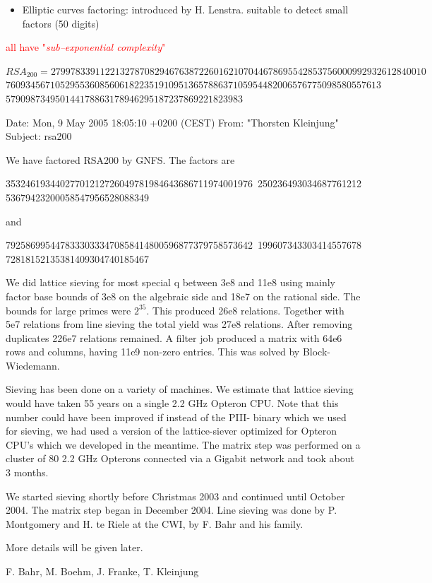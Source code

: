 \documentclass[landscape,handout]{powersem} %
\newcommand{\heading}[1]{%
 \begin{center}
  \large\bf
  \shadowbox{{\textcolor{conceptcolor}{#1}}}%
 \end{center}
 \vspace{1ex minus 1ex}}
\begin{document}
\begin{slide}
\begin{itemize}
\item[\textcolor{blue}{\ding{185}}]
  Elliptic curves factoring: introduced by  H. Lenstra.
  suitable to detect small factors (50 digits)\pause

\end{itemize}

\centerline{\textcolor{red}{all have "\emph{sub--exponential complexity}"}}
\end{slide}

\begin{slide}
\heading{The factorization of $RSA_{200}$}

\begin{tiny}

$RSA_{200}=2799783391122132787082946763872260162107044678695542853756000992932612840010$
          $7609345671052955360856061822351910951365788637105954482006576775098580557613$
          $579098734950144178863178946295187237869221823983$\pause


Date: Mon, 9 May 2005 18:05:10 +0200 (CEST) 
From: "Thorsten Kleinjung"
Subject: rsa200 

We have factored RSA200 by GNFS. The factors are

35324619344027701212726049781984643686711974001976\
25023649303468776121253679423200058547956528088349

and

79258699544783330333470858414800596877379758573642\
19960734330341455767872818152135381409304740185467


We did lattice sieving for most special q between 3e8 and 11e8
using mainly factor base bounds of 3e8 on the algebraic side and 18e7 
on
the rational side. The bounds for large primes were $2^{35}$. This produced
26e8 relations. Together with 5e7 relations from line sieving the total
yield was 27e8 relations. After removing duplicates 226e7 relations
remained. A filter job produced a matrix with 64e6 rows and columns,
having 11e9 non-zero entries. This was solved by Block-Wiedemann.

Sieving has been done on a variety of machines. We estimate that
lattice sieving would have taken 55 years on a single 2.2 GHz Opteron 
CPU.
Note that this number could have been improved if instead of the PIII-
binary which we used for sieving, we had used a version of the
lattice-siever optimized for Opteron CPU's which we developed in the 
meantime.
The matrix step was performed on a cluster of 80 2.2 GHz Opterons 
connected via a Gigabit network and took about 3 months.

We started sieving shortly before Christmas 2003 and continued until
October 2004. The matrix step began in December 2004.
Line sieving was done by P. Montgomery and H. te Riele at the CWI, by
F. Bahr and his family.

More details will be given later.

F. Bahr, M. Boehm, J. Franke, T. Kleinjung
\end{tiny}
\end{slide}
\end{document}
